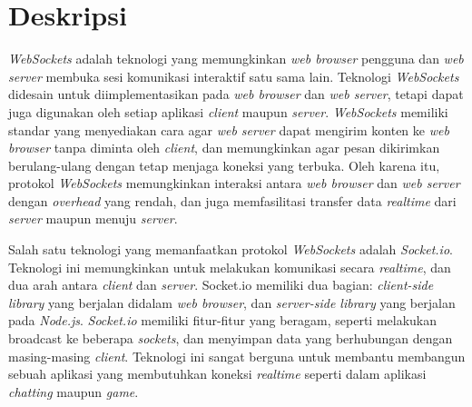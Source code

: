 \documentclass[a4paper,twoside]{article}
\begin{document}
\title{\@judultopik}
\author{\nama \textendash \@npm} 

\newcommand{\nama}{Priambodo Pangestu}
\newcommand{\@npm}{2013730055}
\newcommand{\@judultopik}{Pemanfaatan Smartphone Sebagai Pengendali Permainan Berbasis Web} %
\newcommand{\jumpemb}{1} %
\newcommand{\tanggal}{07/09/2017}
\maketitle


\section{Deskripsi} 
\textit{WebSockets} adalah teknologi yang memungkinkan \textit{web browser} pengguna dan \textit{web server} membuka sesi komunikasi interaktif satu sama lain. Teknologi \textit{WebSockets}  didesain untuk diimplementasikan pada \textit{web browser} dan \textit{web server}, tetapi dapat juga digunakan oleh setiap aplikasi \textit{client} maupun \textit{server}. \textit{WebSockets} memiliki standar yang menyediakan cara agar \textit{web server} dapat mengirim konten ke \textit{web browser} tanpa diminta oleh \textit{client}, dan memungkinkan agar pesan dikirimkan berulang-ulang dengan tetap menjaga koneksi yang terbuka. Oleh karena itu, protokol \textit{WebSockets} memungkinkan interaksi antara \textit{web browser} dan \textit{web server} dengan \textit{overhead} yang rendah, dan juga memfasilitasi transfer data \textit{realtime} dari \textit{server} maupun menuju \textit{server}.

Salah satu teknologi yang memanfaatkan protokol \textit{WebSockets} adalah \textit{Socket.io}. Teknologi ini memungkinkan untuk melakukan komunikasi secara \textit{realtime}, dan dua arah antara \textit{client} dan \textit{server}. Socket.io memiliki dua bagian: \textit{client-side library} yang berjalan didalam \textit{web browser}, dan \textit{server-side library} yang berjalan pada \textit{Node.js}. \textit{Socket.io} memiliki fitur-fitur yang beragam, seperti melakukan broadcast ke beberapa \textit{sockets}, dan menyimpan data yang berhubungan dengan masing-masing \textit{client}. Teknologi ini sangat berguna untuk membantu membangun sebuah aplikasi yang membutuhkan koneksi \textit{realtime} seperti dalam aplikasi \textit{chatting} maupun \textit{game}.
\end{document}
